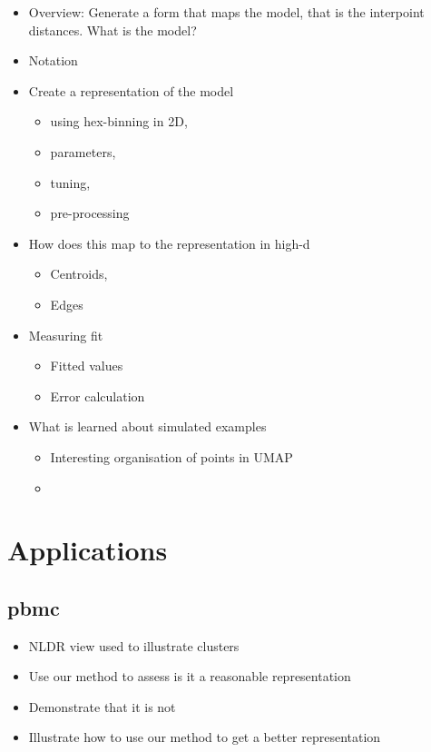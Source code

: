 \documentclass[
  12pt]{article}
\providecommand{\tightlist}{%
  \setlength{\itemsep}{0pt}\setlength{\parskip}{0pt}}\usepackage{longtable,booktabs,array}
\def\tightlist{}
\begin{document}
\begin{itemize}
\tightlist
\item
  Overview: Generate a form that maps the model, that is the interpoint
  distances. What is the model?
\item
  Notation
\item
  Create a representation of the model

  \begin{itemize}
  \tightlist
  \item
    using hex-binning in 2D,
  \item
    parameters,
  \item
    tuning,
  \item
    pre-processing
  \end{itemize}
\item
  How does this map to the representation in high-d

  \begin{itemize}
  \tightlist
  \item
    Centroids,
  \item
    Edges
  \end{itemize}
\item
  Measuring fit

  \begin{itemize}
  \tightlist
  \item
    Fitted values
  \item
    Error calculation
  \end{itemize}
\item
  What is learned about simulated examples

  \begin{itemize}
  \tightlist
  \item
    Interesting organisation of points in UMAP
  \item
  \end{itemize}
\end{itemize}

\section{Applications}\label{sec-applications}

\subsection{pbmc}\label{pbmc}

\begin{itemize}
\tightlist
\item
  NLDR view used to illustrate clusters
\item
  Use our method to assess is it a reasonable representation
\item
  Demonstrate that it is not
\item
  Illustrate how to use our method to get a better representation
\end{itemize}
\end{document}

